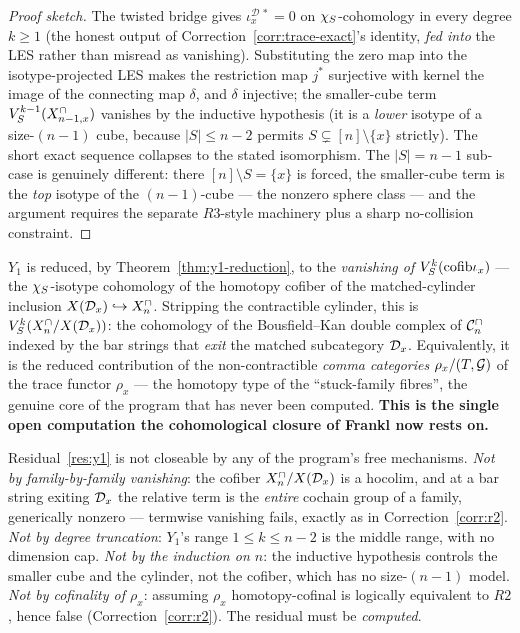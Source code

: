 \begin{proof}[Proof sketch]
The twisted bridge gives $\iota_x^{\mathcal D\,*}=0$ on
$\chi_{S}$-cohomology in every degree $k\ge1$ (the honest output of
Correction~\ref{corr:trace-exact}'s identity, \emph{fed into} the LES
rather than misread as vanishing). Substituting the zero map into the
isotype-projected LES makes the restriction map $j^{*}$ surjective with
kernel the image of the connecting map $\delta$, and $\delta$ injective;
the smaller-cube term $V_{S}^{k-1}(X^{\cap}_{n-1,x})$ vanishes by the inductive
hypothesis (it is a \emph{lower} isotype of a size-$(n-1)$ cube,
because $|S|\le n-2$ permits $S\subsetneq[n]\setminus\{x\}$ strictly).
The short exact sequence collapses to the stated isomorphism. The
$|S|=n-1$ sub-case is genuinely different: there $[n]\setminus S=\{x\}$
is forced, the smaller-cube term is the \emph{top} isotype of the
$(n-1)$-cube --- the nonzero sphere class --- and the argument requires
the separate $R3$-style machinery plus a sharp no-collision constraint.
\end{proof}

\begin{openresidual}
\label{res:y1}
$Y_1$ is reduced, by Theorem~\ref{thm:y1-reduction}, to the
\emph{vanishing of $V_{S}^{k}(\mathrm{cofib}\iota_x)$} --- the
$\chi_{S}$-isotype cohomology of the homotopy cofiber of the
matched-cylinder inclusion $X(\mathcal{D}_x)\hookrightarrow X^{\cap}_n$. Stripping the
contractible cylinder, this is $V_{S}^{k}(X^{\cap}_n/X(\mathcal{D}_x))$: the
cohomology of the Bousfield--Kan double complex of $\mathcal{C}^{\cap}_n$ indexed by the
bar strings that \emph{exit} the matched subcategory $\mathcal{D}_x$.
Equivalently, it is the reduced contribution of the non-contractible
\emph{comma categories} $\rho_x/(T,\mathcal{G})$ of the trace functor $\rho_x$
--- the homotopy type of the ``stuck-family fibres'', the genuine
core of the program that has never been computed. \textbf{This is the
single open computation the cohomological closure of Frankl now rests
on.}
\end{openresidual}

\begin{remark}
\label{rem:no-free-vanishing}
Residual~\ref{res:y1} is not closeable by any of the program's
free mechanisms.
\emph{Not by family-by-family vanishing}: the cofiber
$X^{\cap}_n/X(\mathcal{D}_x)$ is a hocolim, and at a bar string exiting $\mathcal{D}_x$ the
relative term is the \emph{entire} cochain group of a family, generically
nonzero --- termwise vanishing fails, exactly as in
Correction~\ref{corr:r2}.
\emph{Not by degree truncation}: $Y_1$'s range $1\le k\le n-2$ is the
middle range, with no dimension cap.
\emph{Not by the induction on $n$}: the inductive hypothesis controls
the smaller cube and the cylinder, not the cofiber, which has no
size-$(n-1)$ model.
\emph{Not by cofinality of $\rho_x$}: assuming $\rho_x$ homotopy-cofinal
is logically equivalent to $R2$, hence false
(Correction~\ref{corr:r2}). The residual must be \emph{computed}.
\end{remark}

